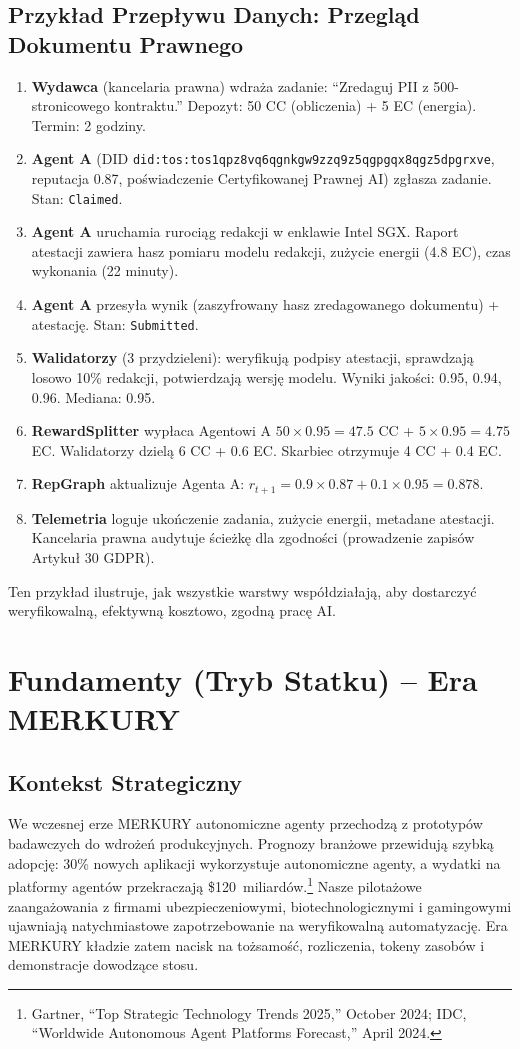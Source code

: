\documentclass[11pt]{article}
\begin{document}
\subsection{Przykład Przepływu Danych: Przegląd Dokumentu Prawnego}
\begin{enumerate}[label=\arabic*.]
  \item \textbf{Wydawca} (kancelaria prawna) wdraża zadanie: ``Zredaguj PII z 500-stronicowego kontraktu.'' Depozyt: 50 CC (obliczenia) + 5 EC (energia). Termin: 2 godziny.
  \item \textbf{Agent A} (DID \texttt{did:tos:tos1qpz8vq6qgnkgw9zzq9z5qgpgqx8qgz5dpgrxve}, reputacja 0.87, poświadczenie Certyfikowanej Prawnej AI) zgłasza zadanie. Stan: \texttt{Claimed}.
  \item \textbf{Agent A} uruchamia rurociąg redakcji w enklawie Intel SGX. Raport atestacji zawiera hasz pomiaru modelu redakcji, zużycie energii (4.8 EC), czas wykonania (22 minuty).
  \item \textbf{Agent A} przesyła wynik (zaszyfrowany hasz zredagowanego dokumentu) + atestację. Stan: \texttt{Submitted}.
  \item \textbf{Walidatorzy} (3 przydzieleni): weryfikują podpisy atestacji, sprawdzają losowo 10\% redakcji, potwierdzają wersję modelu. Wyniki jakości: 0.95, 0.94, 0.96. Mediana: 0.95.
  \item \textbf{RewardSplitter} wypłaca Agentowi A $50 \times 0.95 = 47.5$ CC + $5 \times 0.95 = 4.75$ EC. Walidatorzy dzielą 6 CC + 0.6 EC. Skarbiec otrzymuje 4 CC + 0.4 EC.
  \item \textbf{RepGraph} aktualizuje Agenta A: $r_{t+1} = 0.9 \times 0.87 + 0.1 \times 0.95 = 0.878$.
  \item \textbf{Telemetria} loguje ukończenie zadania, zużycie energii, metadane atestacji. Kancelaria prawna audytuje ścieżkę dla zgodności (prowadzenie zapisów Artykuł 30 GDPR).
\end{enumerate}

Ten przykład ilustruje, jak wszystkie warstwy współdziałają, aby dostarczyć weryfikowalną, efektywną kosztowo, zgodną pracę AI.

\section{Fundamenty (Tryb Statku) -- Era MERKURY}
\subsection{Kontekst Strategiczny}
We wczesnej erze MERKURY autonomiczne agenty przechodzą z prototypów badawczych do wdrożeń produkcyjnych. Prognozy branżowe przewidują szybką adopcję: 30\% nowych aplikacji wykorzystuje autonomiczne agenty, a wydatki na platformy agentów przekraczają \$120~miliardów.\footnote{Gartner, ``Top Strategic Technology Trends 2025,'' October 2024; IDC, ``Worldwide Autonomous Agent Platforms Forecast,'' April 2024.} Nasze pilotażowe zaangażowania z firmami ubezpieczeniowymi, biotechnologicznymi i gamingowymi ujawniają natychmiastowe zapotrzebowanie na weryfikowalną automatyzację. Era MERKURY kładzie zatem nacisk na tożsamość, rozliczenia, tokeny zasobów i demonstracje dowodzące stosu.
\end{document}
